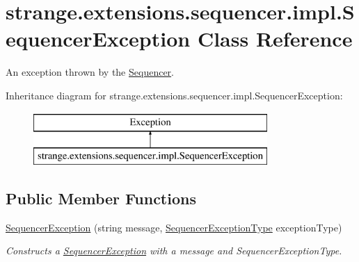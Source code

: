 \hypertarget{classstrange_1_1extensions_1_1sequencer_1_1impl_1_1_sequencer_exception}{\section{strange.\-extensions.\-sequencer.\-impl.\-Sequencer\-Exception Class Reference}
\label{classstrange_1_1extensions_1_1sequencer_1_1impl_1_1_sequencer_exception}
}


An exception thrown by the \hyperlink{classstrange_1_1extensions_1_1sequencer_1_1impl_1_1_sequencer}{Sequencer}.  


Inheritance diagram for strange.\-extensions.\-sequencer.\-impl.\-Sequencer\-Exception\-:\begin{figure}[H]
\begin{center}
\leavevmode
\includegraphics[height=2.000000cm]{classstrange_1_1extensions_1_1sequencer_1_1impl_1_1_sequencer_exception}
\end{center}
\end{figure}
\subsection*{Public Member Functions}
\begin{DoxyCompactItemize}
\item 
\hypertarget{classstrange_1_1extensions_1_1sequencer_1_1impl_1_1_sequencer_exception_a6d49942050ce35afe047465a2782627f}{\hyperlink{classstrange_1_1extensions_1_1sequencer_1_1impl_1_1_sequencer_exception_a6d49942050ce35afe047465a2782627f}{Sequencer\-Exception} (string message, \hyperlink{namespacestrange_1_1extensions_1_1sequencer_1_1api_aeddaacdea22f90d94ab298d24cbce41b}{Sequencer\-Exception\-Type} exception\-Type)}\label{classstrange_1_1extensions_1_1sequencer_1_1impl_1_1_sequencer_exception_a6d49942050ce35afe047465a2782627f}

\begin{DoxyCompactList}\small\item\em Constructs a \hyperlink{classstrange_1_1extensions_1_1sequencer_1_1impl_1_1_sequencer_exception}{Sequencer\-Exception} with a message and Sequencer\-Exception\-Type. \end{DoxyCompactList}\end{DoxyCompactItemize}
